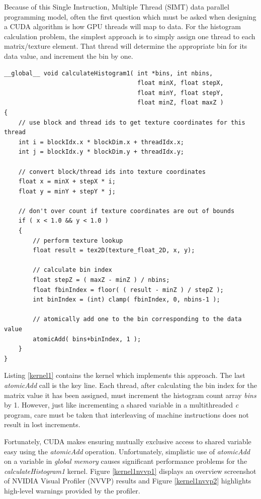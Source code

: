 \documentclass{article}
\begin{document}
Because of this Single Instruction, Multiple Thread (SIMT) data parallel programming model, often the first question which must be asked when designing a CUDA algorithm is how GPU threads will map to data. For the histogram calculation problem, the simplest approach is to simply assign one thread to each matrix/texture element. That thread will determine the appropriate bin for its data value, and increment the bin by one.

\lstset{language=C,basicstyle=\footnotesize}
\begin{minipage}{\textwidth}
\begin{lstlisting}[caption={Global Memory atomicAdd kernel},label={kernel1}]
__global__ void calculateHistogram1( int *bins, int nbins,
                                     float minX, float stepX,
                                     float minY, float stepY,
                                     float minZ, float maxZ )
{
    // use block and thread ids to get texture coordinates for this thread
    int i = blockIdx.x * blockDim.x + threadIdx.x;
    int j = blockIdx.y * blockDim.y + threadIdx.y;

    // convert block/thread ids into texture coordinates
    float x = minX + stepX * i;
    float y = minY + stepY * j;

    // don't over count if texture coordinates are out of bounds
    if ( x < 1.0 && y < 1.0 )
    {
        // perform texture lookup
        float result = tex2D(texture_float_2D, x, y);
    
        // calculate bin index
        float stepZ = ( maxZ - minZ ) / nbins;
        float fbinIndex = floor( ( result - minZ ) / stepZ );
        int binIndex = (int) clamp( fbinIndex, 0, nbins-1 );
    
        // atomically add one to the bin corresponding to the data value
        atomicAdd( bins+binIndex, 1 );
    }
}
\end{lstlisting}
\end{minipage}

Listing \ref{kernel1} contains the kernel which implements this approach. The last \emph{atomicAdd} call is the key line. Each thread, after calculating the bin index for the matrix value it has been assigned, must increment the histogram count array \emph{bins} by 1. However, just like incrementing a shared variable in a multithreaded \emph{c} program, care must be taken that interleaving of machine instructions does not result in lost increments.

Fortunately, CUDA makes ensuring mutually exclusive access to shared variable easy using the \emph{atomicAdd} operation\cite{arithmetic-functions}. Unfortunately, simplistic use of \emph{atomicAdd} on a variable in \emph{global memory} causes significant performance problems for the \emph{calculateHistogram1} kernel. Figure \ref{kernel1nvvp1} displays an overview screenshot of NVIDIA Visual Profiler (NVVP) results and Figure \ref{kernel1nvvp2} highlights high-level warnings provided by the profiler.
\end{document}
